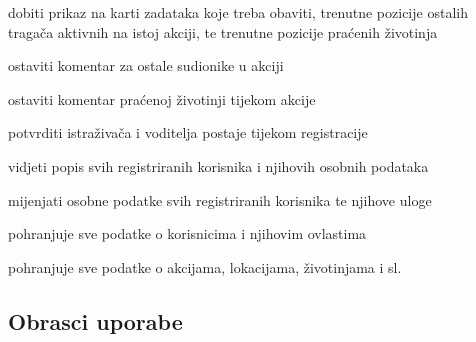 \begin{packed_enum}
\begin{packed_enum}
				\end{packed_enum}
				
				\item  {}
				
				\begin{packed_enum}
					 
					\item dobiti prikaz na karti zadataka koje treba obaviti, trenutne pozicije ostalih tragača aktivnih na istoj akciji, te trenutne pozicije praćenih životinja 
					\item ostaviti komentar za ostale sudionike u akciji
					\item ostaviti komentar praćenoj životinji tijekom akcije 
					
				\end{packed_enum}
				
				\item  {}
				
				\begin{packed_enum}
					
					\item potvrditi istraživača i voditelja postaje tijekom registracije
					\item vidjeti popis svih registriranih korisnika i njihovih osobnih podataka  
					\item mijenjati osobne podatke svih registriranih korisnika te njihove uloge
					
				\end{packed_enum}
				
				\item  {}
				
				\begin{packed_enum}
					
					\item pohranjuje sve podatke o korisnicima i njihovim ovlastima 
					\item pohranjuje sve podatke o akcijama, lokacijama, životinjama i sl. 
					
				\end{packed_enum}
			\end{packed_enum}
			
			\eject 
			
			
				
			\subsection{Obrasci uporabe}
								
